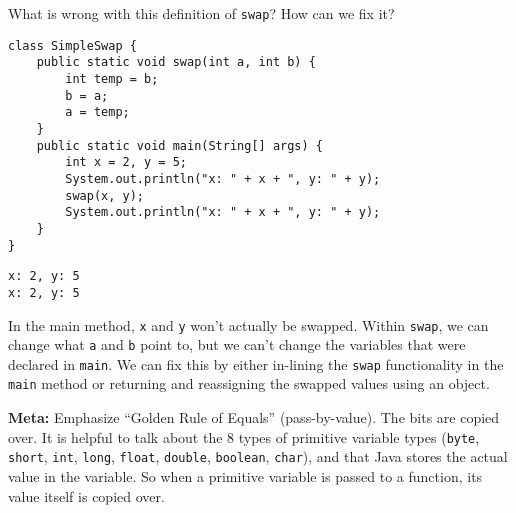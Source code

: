 \begin{blocksection}
\question What is wrong with this definition of \lstinline$swap$? How can we fix it?

\begin{lstlisting}
class SimpleSwap {
    public static void swap(int a, int b) {
        int temp = b;
        b = a;
        a = temp;
    }
    public static void main(String[] args) {
        int x = 2, y = 5;
        System.out.println("x: " + x + ", y: " + y);
        swap(x, y);
        System.out.println("x: " + x + ", y: " + y);
    }
}
\end{lstlisting}

\begin{solution}
\begin{verbatim}
x: 2, y: 5
x: 2, y: 5
\end{verbatim}
In the main method, \lstinline$x$ and \lstinline$y$ won't actually be swapped.
Within \lstinline$swap$, we can change what \lstinline$a$ and \lstinline$b$
point to, but we can't change the variables that were declared in
\lstinline$main$. We can fix this by either in-lining the \lstinline$swap$
functionality in the \lstinline$main$ method or returning and reassigning the
swapped values using an object.

\textbf{Meta:} Emphasize ``Golden Rule of Equals'' (pass-by-value). The bits
are copied over.  It is helpful to talk about the 8 types of primitive variable
types (\lstinline$byte$, \lstinline$short$, \lstinline$int$, \lstinline$long$,
\lstinline$float$, \lstinline$double$, \lstinline$boolean$, \lstinline$char$),
and that Java stores the actual value in the variable. So when a primitive
variable is passed to a function, its value itself is copied over.
\end{solution}
\end{blocksection}
